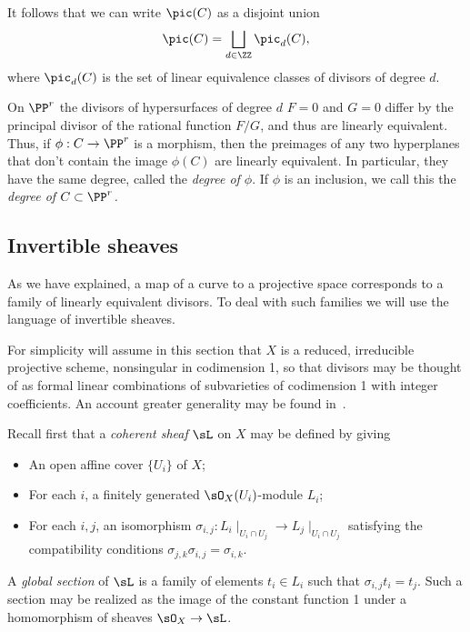 It follows that we can write $\pic(C)$ as a disjoint union
$$
\pic(C) = \bigsqcup_{d \in \ZZ} \pic_d(C),
$$
where $\pic_d(C)$ is the set of linear equivalence classes of divisors of degree $d$.

On $\PP^r$ the divisors of hypersurfaces of degree $d$ $F = 0$ and $G=0$ differ by the principal divisor of the rational function $F/G$,
and thus are linearly equivalent. Thus, if $\phi : C \to \PP^r$ is a morphism, then the preimages
of any two hyperplanes that don't contain the image $\phi(C)$ are linearly equivalent. In particular, they have the same
degree, called the \emph{degree of $\phi$}. If $\phi$ is an inclusion, we call this the \emph{degree of $C\subset \PP^r$.}

\subsection{Invertible sheaves}\label{Invertible sheaves}

As we have explained, a map of a curve to a projective space corresponds to a family of linearly equivalent divisors.
To deal with such families we will use the language of invertible sheaves. 

For simplicity will assume in this section that $X$ is a reduced, irreducible projective
scheme, nonsingular in codimension 1, so that divisors may be thought of as formal linear combinations of
subvarieties of codimension 1 with integer coefficients. 
  An account greater generality may be found in~\cite{Hartshorne1977}.

Recall first that a \emph{coherent sheaf} $\sL$ on $X$ may be defined by
giving 
\begin{itemize}
 \item An open affine cover $\{U_{i}\}$ of $X$; 
 \item For each $i$, a finitely generated $\sO_{X}(U_{i})$-module $L_{i}$;
 \item For each $i,j$, an isomorphism $\sigma_{i,j}: L_{i}\mid_{U_{i}\cap U_{j}} \to L_{j}\mid_{U_{i}\cap U_{j}}$
 satisfying the compatibility conditions $\sigma_{j,k}\sigma_{i,j} = \sigma_{i,k}$. 
 \end{itemize}

A \emph{global section} of $\sL$ is a family of elements $t_{i}\in L_{i}$ such that 
$\sigma_{i,j} t_{i} = t_{j}$. Such a section may be realized as the image of the constant function 1 under
a homomorphism of sheaves $\sO_{X} \to \sL$. 

